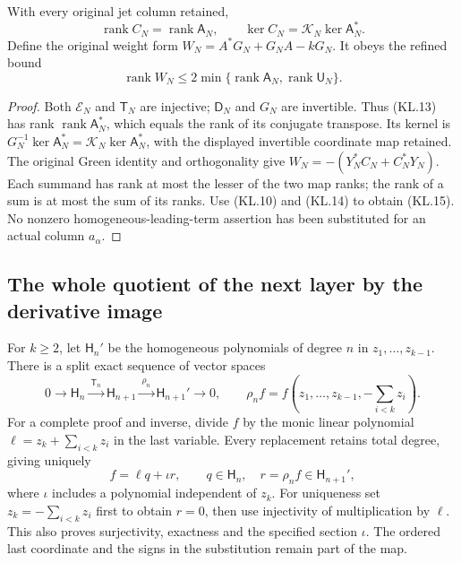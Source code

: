 \begin{theorem}
With every original jet column retained,
\[
 \boxed{\operatorname{rank}C_N=\operatorname{rank}\mathsf A_N,
 \qquad \ker C_N=\mathcal K_N\ker\mathsf A_N^*.}         \tag{KL.14}
\]
Define the original weight form
\(W_N=A^*G_N+G_NA-kG_N\).  It obeys the refined bound
\[
 \operatorname{rank}W_N\leq
  2\min\{\operatorname{rank}\mathsf A_N,
                         \operatorname{rank}\mathsf U_N\}.
                                                               \tag{KL.15}
\]
\end{theorem}
\begin{proof}
Both \(\mathscr E_N\) and \(\mathsf T_N\) are injective;
\(\mathsf D_N\) and \(G_N\) are invertible.  Thus (KL.13)
has rank \(\operatorname{rank}\mathsf A_N^*\), which equals
the rank of its conjugate transpose.  Its kernel is
\(G_N^{-1}\ker\mathsf A_N^*=\mathcal K_N\ker\mathsf A_N^*\),
with the displayed invertible coordinate map retained.  The original
Green identity and orthogonality give
\(W_N=-(Y_N^*C_N+C_N^*Y_N)\).  Each summand has rank at most
the lesser of the two map ranks; the rank of a sum is at most the
sum of its ranks.  Use (KL.10) and (KL.14) to obtain (KL.15).
No nonzero homogeneous-leading-term assertion has been substituted
for an actual column \(a_\alpha\).
\end{proof}

\subsection{The whole quotient of the next layer by the derivative image}

For \(k\geq2\), let \(\mathsf H_n'\) be the homogeneous
polynomials of degree \(n\) in \(z_1,\ldots,z_{k-1}\).
There is a split exact sequence of vector spaces
\[
 0\longrightarrow\mathsf H_n
  \xrightarrow{\ \mathsf T_n\ }\mathsf H_{n+1}
  \xrightarrow{\ \rho_n\ }\mathsf H_{n+1}'
  \longrightarrow0,\qquad
 \rho_n f=f(z_1,\ldots,z_{k-1},-\!\sum_{i<k}z_i).
                                                               \tag{KL.16}
\]
For a complete proof and inverse, divide \(f\) by the monic
linear polynomial \(\ell=z_k+\sum_{i<k}z_i\) in the last
variable.  Every replacement retains total degree, giving uniquely
\[
 f=\ell q+\iota r,\qquad q\in\mathsf H_n,
 \quad r=\rho_nf\in\mathsf H_{n+1}',                    \tag{KL.17}
\]
where \(\iota\) includes a polynomial independent of \(z_k\).
For uniqueness set \(z_k=-\sum_{i<k}z_i\) first to obtain
\(r=0\), then use injectivity of multiplication by \(\ell\).
This also proves surjectivity, exactness and the specified section
\(\iota\).  The ordered last coordinate and the signs in the
substitution remain part of the map.

